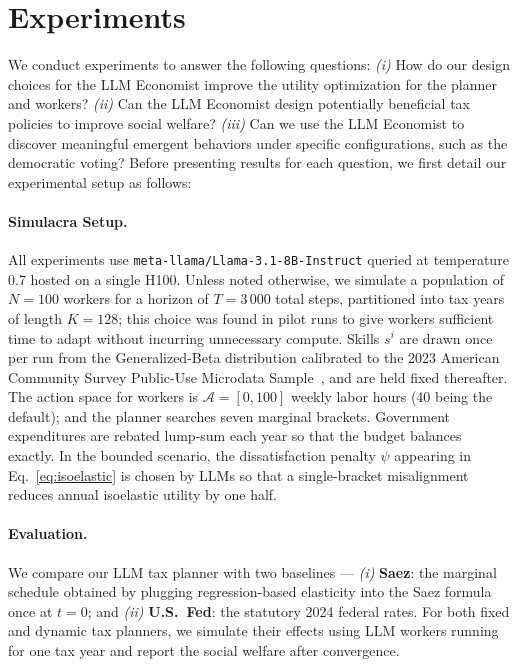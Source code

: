 
\section{Experiments}\label{sec:experiments}

We conduct experiments to answer the following questions: \textit{(i)} How do our design choices for the LLM Economist improve the utility optimization for the planner and workers? \textit{(ii)} Can the LLM Economist design potentially beneficial tax policies to improve social welfare? \textit{(iii)} Can we use the LLM Economist to discover meaningful emergent behaviors under specific configurations, such as the democratic voting?
Before presenting results for each question, we first detail our experimental setup as follows:

\paragraph{Simulacra Setup.}\label{sec:sim_setup}
All experiments use \texttt{meta-llama/Llama-3.1-8B-Instruct} queried at temperature 0.7 hosted on a single H100.  
Unless noted otherwise, we simulate a population of $N=100$ workers for a horizon of $T=3\,000$ total steps, partitioned into tax years of length $K=128$; this choice was found in pilot runs to give workers sufficient time to adapt without incurring unnecessary compute.  
Skills $s^{i}$ are drawn once per run from the Generalized-Beta distribution calibrated to the 2023 American Community Survey Public-Use Microdata Sample~\citep{acs2023pums}, and are held fixed thereafter.  
The action space for workers is $\mathcal{A}=[0,100]$ weekly labor hours (40 being the default); and the planner searches seven marginal brackets.  
Government expenditures are rebated lump-sum each year so that the budget balances exactly.  
In the bounded scenario, the dissatisfaction penalty $\psi$ appearing in Eq.~\eqref{eq:isoelastic} is chosen by LLMs so that a single-bracket misalignment reduces annual isoelastic utility by one half.

\paragraph{Evaluation.} We compare our LLM tax planner with two baselines --- \textit{(i)} \textbf{Saez}: the marginal schedule obtained by plugging regression-based elasticity into the Saez formula once at $t=0$; and \textit{(ii)} \textbf{U.S.~Fed}: the statutory 2024 federal rates. 
For both fixed and dynamic tax planners, we simulate their effects using LLM workers running for one tax year and report the social welfare after convergence.

